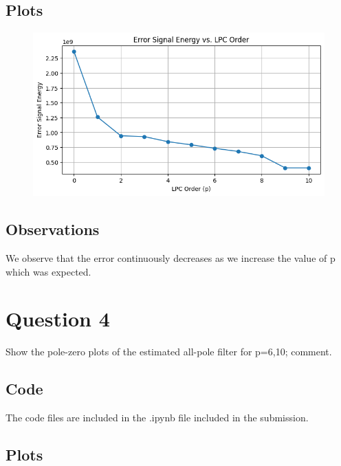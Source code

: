 \documentclass{article}
\begin{document}
\subsection{Plots}

\begin{figure}[H]
\begin{center}
\includegraphics[scale = 0.5]{err.png}
\end{center}
\end{figure}

\subsection{Observations}
We observe that the error continuously decreases as we increase the value of p which was expected.

\section{Question 4}
Show the pole-zero plots of the estimated all-pole filter for p=6,10; comment.


\subsection{Code}
The code files are included in the .ipynb file included in the submission.

\subsection{Plots}
\end{document}
